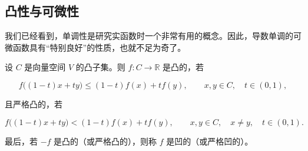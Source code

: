 \subsection*{凸性与可微性}

我们已经看到，单调性是研究实函数时一个非常有用的概念。因此，导数单调的可微函数具有“特别良好”的性质，也就不足为奇了。

设 $C$ 是向量空间 $V$ 的凸子集。则 $f: C \to \mathbb{R}$ 是凸的，若

\begin{equation}
f\big((1-t)x+t y\big)\leq(1-t)f(x)+t f(y),\qquad x,y\in C,\quad t\in(0,1),
\end{equation}

且严格凸的，若

\[
f\big((1-t)x+t y\big)<(1-t)f(x)+t f(y),\qquad x,y\in C,\quad x\neq y,\quad t\in(0,1).
\]

最后，若 $-f$ 是凸的（或严格凸的），则称 $f$ 是凹的（或严格凹的）。


